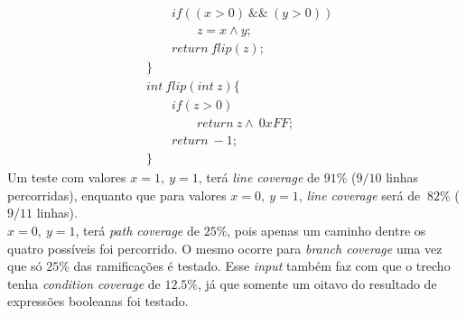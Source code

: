 \documentclass[paper=a4, fontsize=11pt]{scrartcl} %
\numberwithin{equation}{section} %
\numberwithin{figure}{section} %
\numberwithin{table}{section} %
\begin{document}
\begin{itemize}
\begin{align*}
             & \qquad if((x>0)\ \&\&\ (y>0))\\
             & \qquad \qquad z=x \wedge y;\\
             & \qquad return\ flip(z);\\
             & \}\\
             & int\ flip(int\ z)\{\\
             &\qquad if(z>0)\\
             &\qquad \qquad return\ z \wedge\ 0xFF;\\
             &\qquad return\ -1;\\
             &\}
         \end{align*}
         Um teste com valores $x = 1,\ y = 1$, terá \textit{line coverage} de $91\%$ ($9/10$ linhas percorridas), enquanto que para valores $x = 0,\ y = 1$, \textit{line coverage} será de $~82\%$ ($9/11$ linhas).\\
          $x = 0,\ y = 1$, terá \textit{path coverage} de $25\%$, pois apenas um caminho dentre os quatro possíveis foi percorrido. O mesmo ocorre para \textit{branch coverage} uma vez que só $25\%$ das ramificações é testado. Esse \textit{input} também faz com que o trecho tenha \textit{condition coverage} de $12.5\%$, já que somente um oitavo do resultado de expressões booleanas foi testado.        
    \end{itemize}
\end{document}
